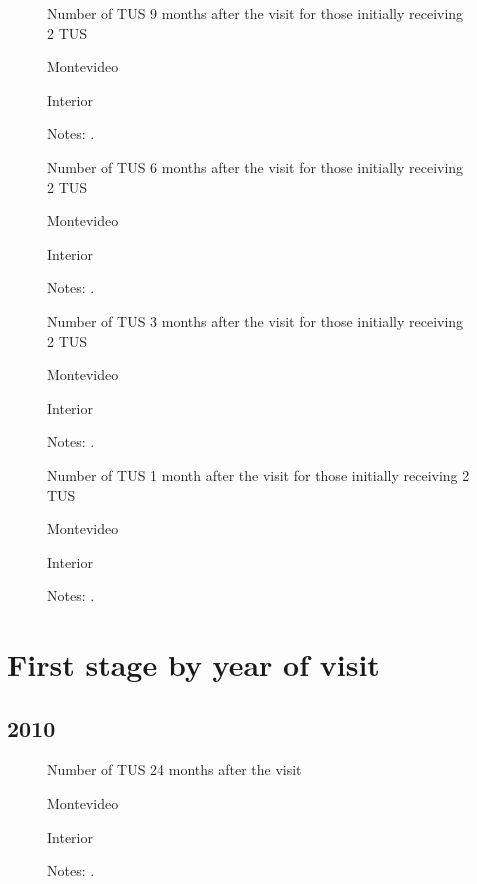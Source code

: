 \documentclass[12pt]{article}
\begin{document}
\begin{figure}[H]%
	\caption{Number of TUS 9 months after the visit for those initially receiving 2 TUS}%
	\centering
	\caption*{ {Montevideo}}
	\qquad
	\caption*{Interior}
	\label{fig:first_stage_si2Tus_tus9}%
	\caption*{ {\footnotesize Notes: .}}
\end{figure}

\begin{figure}[H]%
	\caption{Number of TUS 6 months after the visit for those initially receiving 2 TUS}%
	\centering
	\caption*{ {Montevideo}}
	\qquad
	\caption*{Interior}
	\label{fig:first_stage_si2Tus_tus6}%
	\caption*{ {\footnotesize Notes: .}}
\end{figure}

\begin{figure}[H]%
	\caption{Number of TUS 3 months after the visit for those initially receiving 2 TUS}%
	\centering
	\caption*{ {Montevideo}}
	\qquad
	\caption*{Interior}
	\label{fig:first_stage_si2Tus_tus3}%
	\caption*{ {\footnotesize Notes: .}}
\end{figure}

\begin{figure}[H]%
	\caption{Number of TUS 1 month after the visit for those initially receiving 2 TUS}%
	\centering
	\caption*{ {Montevideo}}
	\qquad
	\caption*{Interior}
	\label{fig:first_stage_si2Tus_tus1}%
	\caption*{ {\footnotesize Notes: .}}
\end{figure}

\section{First stage by year of visit}

\subsection{2010}

\begin{figure}[H]%
	\caption{Number of TUS 24 months after the visit}%
	\centering
	\caption*{ {Montevideo}}
	\qquad
	\caption*{Interior}
	\label{fig:first_stage_2010_tus24}%
	\caption*{ {\footnotesize Notes: .}}
\end{figure}
\end{document}
